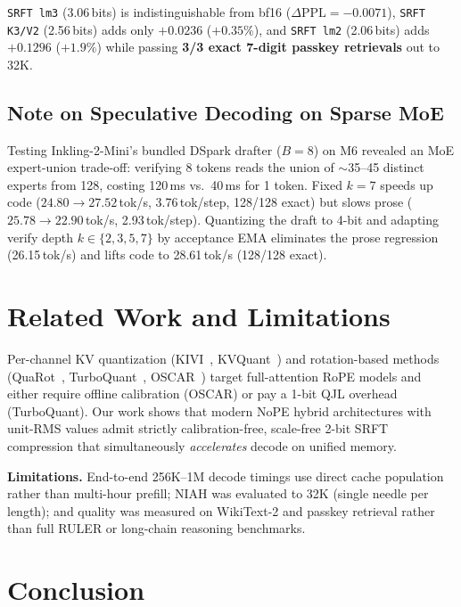 \documentclass[conference]{IEEEtran}
\newcommand{\dPPL}{\Delta\mathrm{PPL}}
\begin{document}
\texttt{SRFT lm3} (3.06\,bits) is indistinguishable from bf16 ($\dPPL=-0.0071$), \texttt{SRFT K3/V2} (2.56\,bits) adds only $+0.0236$ ($+0.35\%$), and \texttt{SRFT lm2} (2.06\,bits) adds $+0.1296$ ($+1.9\%$) while passing \textbf{3/3 exact 7-digit passkey retrievals} out to 32K.

\subsection{Note on Speculative Decoding on Sparse MoE}
Testing Inkling-2-Mini's bundled DSpark drafter ($B=8$) on M6 revealed an MoE expert-union trade-off: verifying 8 tokens reads the union of $\sim$35--45 distinct experts from 128, costing 120\,ms vs.\ 40\,ms for 1 token. Fixed $k=7$ speeds up code ($24.80 \to 27.52$\,tok/s, 3.76\,tok/step, 128/128 exact) but slows prose ($25.78 \to 22.90$\,tok/s, 2.93\,tok/step). Quantizing the draft to 4-bit and adapting verify depth $k \in \{2,3,5,7\}$ by acceptance EMA eliminates the prose regression (26.15\,tok/s) and lifts code to 28.61\,tok/s (128/128 exact).

\section{Related Work and Limitations}
\label{sec:related}

Per-channel KV quantization (KIVI~\cite{liu2024kivi}, KVQuant~\cite{hooper2024kvquant}) and rotation-based methods (QuaRot~\cite{ashkboos2024quarot}, TurboQuant~\cite{zandieh2026turboquant}, OSCAR~\cite{zhou2026oscar}) target full-attention RoPE models and either require offline calibration (OSCAR) or pay a 1-bit QJL overhead (TurboQuant). Our work shows that modern NoPE hybrid architectures with unit-RMS values admit strictly calibration-free, scale-free 2-bit SRFT compression that simultaneously \emph{accelerates} decode on unified memory.

\textbf{Limitations.} End-to-end 256K--1M decode timings use direct cache population rather than multi-hour prefill; NIAH was evaluated to 32K (single needle per length); and quality was measured on WikiText-2 and passkey retrieval rather than full RULER or long-chain reasoning benchmarks.

\section{Conclusion}
\label{sec:conclusion}
\end{document}
